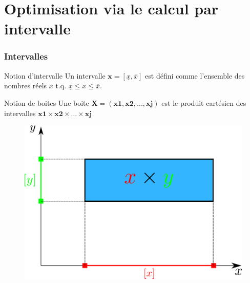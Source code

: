 \documentclass{beamer}
\begin{document}
\section[Calcul par intervalles]{Optimisation via le calcul par intervalle}
\begin{frame}
    \frametitle{Intervalles}
    \begin{block}{Notion d'intervalle}
        Un intervalle $\textbf{x} = [\underline{x}, \overline{x}]$ est défini comme l'ensemble des nombres réels $x$ t.q. $\underline{x} \leq x \leq \overline{x}$. 
    \end{block}

    \begin{block}{Notion de boites}
        Une boite $\textbf{X} = (\textbf{x1}, \textbf{x2}, ..., \textbf{xj})$ est le produit cartésien des intervalles $\textbf{x1} \times \textbf{x2} \times \dots \times \textbf{xj}$
    \end{block}

    \begin{figure}[H]
        \centering
        \includegraphics[scale=0.5]{images/box.png}
        \caption{}
        \label{fig:box}
    \end{figure}
\end{frame}
\end{document}
